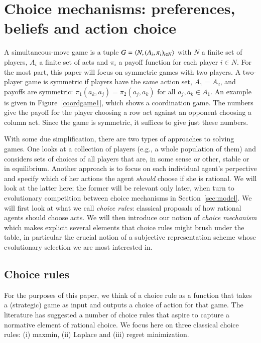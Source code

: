 \documentclass[fleqn,reqno,11pt]{article}
\begin{document}
\section{Choice mechanisms: preferences, beliefs and action choice}
\label{sec:basic-notions}

A simultaneous-move game is a tuple $ G=\left \langle  N, (A_i , \pi_i)_{i \in N} \right\rangle$ with $N$ a finite set of
players, $A_i$ a finite set of acts and $\pi_i$ a payoff function for each player $i \in N$. For the
most part, this paper will focus on symmetric games with two players. A two-player game is
symmetric if players have the same action set, $A_1 = A_2$, and payoffs are symmetric:
$\pi_1(a_k, a_j) = \pi_2(a_j, a_k)$ for all $a_j,a_k \in A_1$. An example is
given in Figure~\ref{coordgame1}, which shows a coordination game. The numbers give the payoff
for the player choosing a row act against an opponent choosing a column act. Since the game is
symmetric, it suffices to give just these numbers.

With some due simplification, there are two types of approaches to solving games. One looks at
a collection of players (e.g., a whole population of them) and considers sets of choices of all
players that are, in some sense or other, stable or in equilibrium. Another approach is to
focus on each individual agent's perpective and specify which of her actions the agent
\emph{should} choose if she is rational. We will look at the latter here; the former will be
relevant only later, when turn to evolutionary competition between choice mechanisms in
Section~\ref{sec:model}. We will first look at what we call \emph{choice rules}: classical
proposals of how rational agents should choose acts. We will then introduce our notion of
\emph{choice mechanism} which makes explicit several elements that choice rules might brush
under the table, in particular the crucial notion of a subjective representation scheme whose
evolutionary selection we are most interested in.


\subsection{Choice rules} 
\label{sec:choice-rules}

For the purposes of this paper, we think of a choice rule as a function that takes a
(strategic) game as input and outputs a choice of action for that game. The literature has
suggested a number of choice rules that aspire to capture a normative element of rational
choice. We focus here on three classical choice rules: (i) maxmin, (ii) Laplace and (iii)
regret minimization.
\end{document}
